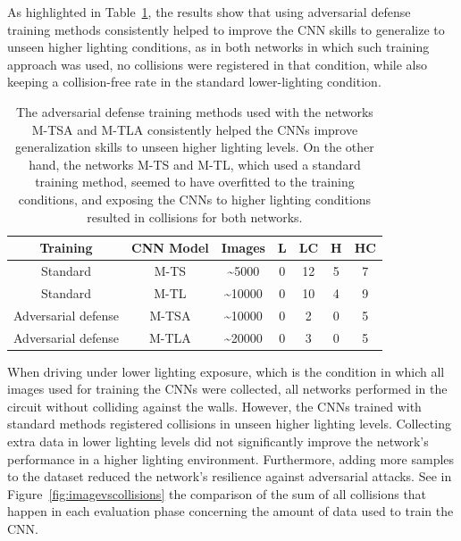 \documentclass[12pt]{article}
\begin{document}
As highlighted in Table~\ref{tab:allmodelstabconclusion}, the results show that using adversarial defense training methods consistently helped to improve the CNN skills to generalize to unseen higher lighting conditions, as in both networks in which such training approach was used, no collisions were registered in that condition, while also keeping a collision-free rate in the standard lower-lighting condition. 

\begin{table}[H]
\begin{center}
\begin{tabular}{ |c|c|c|c|c|c|c| } 
\hline
Training & CNN Model & Images & L & LC & H & HC \\
\hline
Standard & M-TS & \textasciitilde5000 & 0 & 12 & 5 & 7 \\
Standard & M-TL & \textasciitilde10000 & 0 & 10 & 4 & 9 \\
Adversarial defense & M-TSA & \textasciitilde10000 & 0 & 2 & 0 & 5 \\
Adversarial defense & M-TLA & \textasciitilde20000 & 0 & 3 & 0 & 5 \\
\hline
\end{tabular}
\caption{\label{tab:allmodelstabconclusion} The adversarial defense training methods used with the networks M-TSA and M-TLA consistently helped the CNNs improve generalization skills to unseen higher lighting levels. On the other hand, the networks M-TS and M-TL, which used a standard training method, seemed to have overfitted to the training conditions, and exposing the CNNs to higher lighting conditions resulted in collisions for both networks. }
\end{center}
\end{table}

When driving under lower lighting exposure, which is the condition in which all images used for training the CNNs were collected, all networks performed in the circuit without colliding against the walls. However, the CNNs trained with standard methods registered collisions in unseen higher lighting levels. Collecting extra data in lower lighting levels did not significantly improve the network's performance in a higher lighting environment. Furthermore, adding more samples to the dataset reduced the network's resilience against adversarial attacks. See in Figure~\ref{fig:imagevscollisions} the comparison of the sum of all collisions that happen in each evaluation phase concerning the amount of data used to train the CNN.
\end{document}
